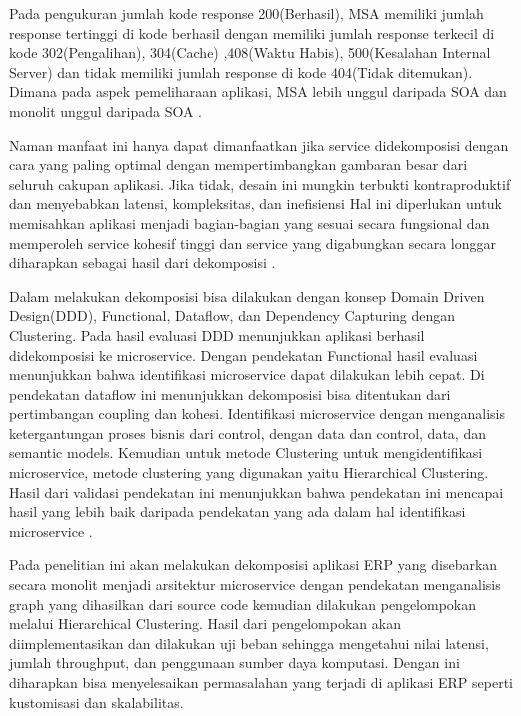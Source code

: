 Pada pengukuran jumlah kode response 200(Berhasil), MSA memiliki jumlah response tertinggi di kode berhasil dengan memiliki jumlah response terkecil di kode 302(Pengalihan), 304(Cache) ,408(Waktu Habis), 500(Kesalahan Internal Server) dan tidak memiliki jumlah response di kode 404(Tidak ditemukan). Dimana pada aspek pemeliharaan aplikasi, MSA lebih unggul daripada SOA dan monolit unggul daripada SOA \cite{4}.

Naman manfaat ini hanya dapat dimanfaatkan jika service didekomposisi dengan cara yang paling optimal dengan mempertimbangkan gambaran besar dari seluruh cakupan aplikasi. Jika tidak, desain ini mungkin terbukti kontraproduktif dan menyebabkan latensi, kompleksitas, dan inefisiensi Hal ini diperlukan untuk memisahkan aplikasi menjadi bagian-bagian yang sesuai secara fungsional dan memperoleh service kohesif tinggi dan service yang digabungkan secara longgar diharapkan sebagai hasil dari dekomposisi \cite{3}.

Dalam melakukan dekomposisi bisa dilakukan dengan konsep Domain Driven Design(DDD), Functional, Dataflow, dan Dependency Capturing dengan Clustering. Pada hasil evaluasi DDD menunjukkan aplikasi berhasil didekomposisi ke microservice. Dengan pendekatan Functional hasil evaluasi menunjukkan bahwa identifikasi microservice dapat dilakukan lebih cepat. Di pendekatan dataflow ini menunjukkan dekomposisi bisa ditentukan dari pertimbangan coupling dan kohesi. Identifikasi microservice dengan menganalisis ketergantungan proses bisnis dari control, dengan data dan control, data, dan semantic models. Kemudian untuk metode Clustering untuk mengidentifikasi microservice, metode clustering yang digunakan yaitu Hierarchical Clustering. Hasil dari validasi pendekatan ini menunjukkan bahwa pendekatan ini mencapai hasil yang lebih baik daripada pendekatan yang ada dalam hal identifikasi microservice \cite{5}.

Pada penelitian ini akan melakukan dekomposisi aplikasi ERP yang disebarkan secara monolit menjadi arsitektur microservice dengan pendekatan menganalisis graph yang dihasilkan dari source code kemudian dilakukan pengelompokan melalui Hierarchical Clustering. Hasil dari pengelompokan akan diimplementasikan dan dilakukan uji beban sehingga mengetahui nilai latensi, jumlah throughput, dan penggunaan sumber daya komputasi. Dengan ini diharapkan bisa menyelesaikan permasalahan yang terjadi di aplikasi ERP seperti kustomisasi dan skalabilitas.\\

